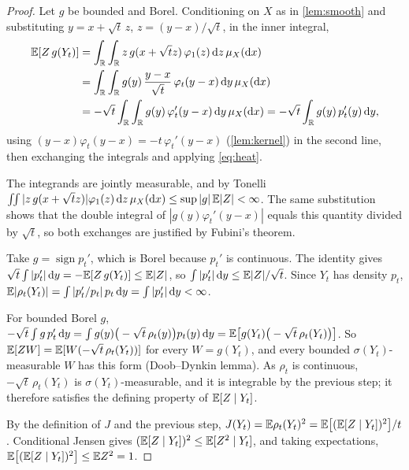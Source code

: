 \documentclass{saim-blog}
\begin{document}
\begin{proof}
Let $g$ be bounded and Borel. Conditioning on $X$ as in \cref{lem:smooth} and substituting $y=x+\sqrt t\,z$, $z=(y-x)/\sqrt t$, in the inner integral,
\[
\begin{aligned}
\mathbb{E}[Z\,g(Y_t)]&=\int_{\mathbb{R}}\int_{\mathbb{R}}z\,g(x+\sqrt t z)\,\varphi_1(z)\mathop{}\!\mathrm{d} z\,\mu_X(\mathop{}\!\mathrm{d} x)\\
&=\int_{\mathbb{R}}\int_{\mathbb{R}}g(y)\,\frac{y-x}{\sqrt t}\,\varphi_t(y-x)\mathop{}\!\mathrm{d} y\,\mu_X(\mathop{}\!\mathrm{d} x)\\
&=-\sqrt t\int_{\mathbb{R}}\int_{\mathbb{R}}g(y)\,\varphi_t'(y-x)\mathop{}\!\mathrm{d} y\,\mu_X(\mathop{}\!\mathrm{d} x)
=-\sqrt t\int_{\mathbb{R}}g(y)\,p_t'(y)\mathop{}\!\mathrm{d} y,
\end{aligned}
\]
using $(y-x)\varphi_t(y-x)=-t\,\varphi_t'(y-x)$ (\cref{lem:kernel}) in the second line, then exchanging the integrals and applying \eqref{eq:heat}.

The integrands are jointly measurable, and by Tonelli
$\int\!\!\int|z\,g(x+\sqrt tz)|\varphi_1(z)\mathop{}\!\mathrm{d} z\,\mu_X(\mathop{}\!\mathrm{d} x)\le\sup|g|\,\mathbb{E}|Z|<\infty$. The same substitution shows that the double integral of $|g(y)\varphi_t'(y-x)|$ equals this quantity divided by $\sqrt t$, so both exchanges are justified by Fubini's theorem.

Take $g=\operatorname{sign}p_t'$, which is Borel because $p_t'$ is continuous. The identity gives $\sqrt t\int|p_t'|\mathop{}\!\mathrm{d} y=-\mathbb{E}[Z\,g(Y_t)]\le\mathbb{E}|Z|$, so $\int|p_t'|\mathop{}\!\mathrm{d} y\le\mathbb{E}|Z|/\sqrt t$. Since $Y_t$ has density $p_t$, $\mathbb{E}|\rho_t(Y_t)|=\int|p_t'/p_t|\,p_t\mathop{}\!\mathrm{d} y=\int|p_t'|\mathop{}\!\mathrm{d} y<\infty$.

For bounded Borel $g$, $-\sqrt t\int g\,p_t'\mathop{}\!\mathrm{d} y=\int g(y)\big(-\sqrt t\,\rho_t(y)\big)p_t(y)\mathop{}\!\mathrm{d} y=\mathbb{E}\big[g(Y_t)\big(-\sqrt t\,\rho_t(Y_t)\big)\big]$. So $\mathbb{E}[ZW]=\mathbb{E}[W(-\sqrt t\,\rho_t(Y_t))]$ for every $W=g(Y_t)$, and every bounded $\sigma(Y_t)$-measurable $W$ has this form (Doob--Dynkin lemma). As $\rho_t$ is continuous, $-\sqrt t\,\rho_t(Y_t)$ is $\sigma(Y_t)$-measurable, and it is integrable by the previous step; it therefore satisfies the defining property of $\mathbb{E}[Z\mid Y_t]$.

By the definition of $J$ and the previous step, $J(Y_t)=\mathbb{E}\rho_t(Y_t)^2=\mathbb{E}\big[(\mathbb{E}[Z\mid Y_t])^2\big]/t$. Conditional Jensen gives $(\mathbb{E}[Z\mid Y_t])^2\le\mathbb{E}[Z^2\mid Y_t]$, and taking expectations, $\mathbb{E}\big[(\mathbb{E}[Z\mid Y_t])^2\big]\le\mathbb{E} Z^2=1$.
\end{proof}
\end{document}
